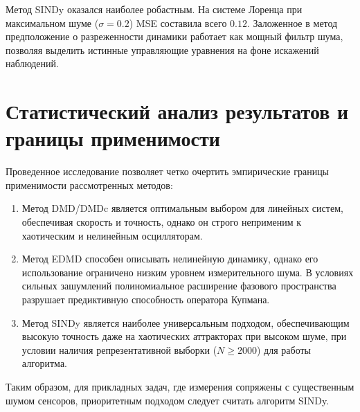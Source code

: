 Метод SINDy оказался наиболее робастным. На системе Лоренца при максимальном шуме ($\sigma=0.2$) MSE составила всего $0.12$. Заложенное в метод предположение о разреженности динамики работает как мощный фильтр шума, позволяя выделить истинные управляющие уравнения на фоне искажений наблюдений.

\section{Статистический анализ результатов и границы применимости}
\label{sec:stats_conclusion}

Проведенное исследование позволяет четко очертить эмпирические границы применимости рассмотренных методов:
\begin{enumerate}
    \item Метод DMD/DMDc является оптимальным выбором для линейных систем, обеспечивая скорость и точность, однако он строго неприменим к хаотическим и нелинейным осцилляторам.
    \item Метод EDMD способен описывать нелинейную динамику, однако его использование ограничено низким уровнем измерительного шума. В условиях сильных зашумлений полиномиальное расширение фазового пространства разрушает предиктивную способность оператора Купмана.
    \item Метод SINDy является наиболее универсальным подходом, обеспечивающим высокую точность даже на хаотических аттракторах при высоком шуме, при условии наличия репрезентативной выборки ($N \ge 2000$) для работы алгоритма.
\end{enumerate}

Таким образом, для прикладных задач, где измерения сопряжены с существенным шумом сенсоров, приоритетным подходом следует считать алгоритм SINDy.